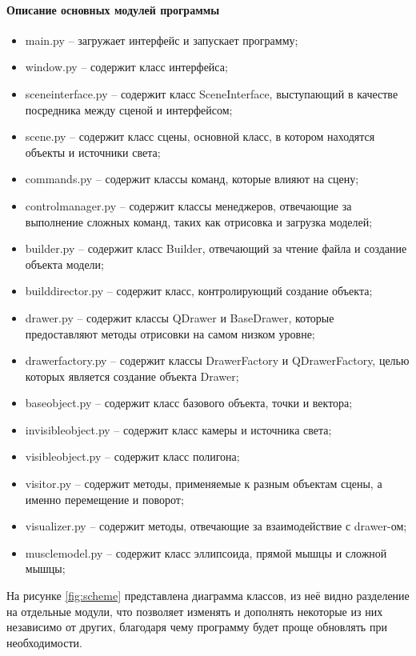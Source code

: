 \paragraph{Описание основных модулей программы}
\begin{itemize}
	\item main.py -- загружает интерфейс и запускает программу;
	\item window.py -- содержит класс интерфейса;
	\item sceneinterface.py -- содержит класс SceneInterface, выступающий в качестве посредника между сценой и интерфейсом;
	\item scene.py -- содержит класс сцены, основной класс, в котором находятся объекты и источники света;
	\item commands.py -- содержит классы команд, которые влияют на сцену;
	\item controlmanager.py -- содержит классы менеджеров, отвечающие за выполнение сложных команд, таких как отрисовка и загрузка моделей;
	\item builder.py -- содержит класс Builder, отвечающий за чтение файла и создание объекта модели;
	\item builddirector.py -- содержит класс, контролирующий создание объекта;
	\item drawer.py -- содержит классы QDrawer и BaseDrawer, которые предоставляют методы отрисовки на самом низком уровне;
	\item drawerfactory.py -- содержит классы DrawerFactory и QDrawerFactory, целью которых является создание объекта Drawer;
	\item baseobject.py -- содержит класс базового объекта, точки и вектора;
	\item invisibleobject.py -- содержит класс камеры и источника света;
	\item visibleobject.py -- содержит класс полигона;
	\item visitor.py -- содержит методы, применяемые к разным объектам сцены, а именно перемещение и поворот;
	\item visualizer.py -- содержит методы, отвечающие за взаимодействие с drawer-ом;
	\item musclemodel.py -- содержит класс эллипсоида, прямой мышцы и сложной мышцы;
\end{itemize}
На рисунке \ref{fig:scheme} представлена диаграмма классов, из неё видно разделение на отдельные модули, что позволяет изменять и дополнять некоторые из них независимо от других, благодаря чему программу будет проще обновлять при необходимости.
